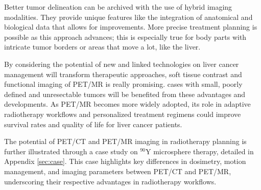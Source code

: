 

Better tumor delineation can be archived with the use of hybrid imaging modalities. They provide unique features like the integration of anatomical and biological data that allows for improvements. More precise treatment planning is possible as this approach advances; this is especially true for body parts with intricate tumor borders or areas that move a lot, like the liver.



By considering the potential of new and linked technologies on liver cancer management will transform therapeutic approaches, soft tissue contrast and functional imaging of PET/MR is really promising. cases with small, poorly defined and unresectable tumors will be benefited from these advantages and developments. As PET/MR becomes more widely adopted, its role in adaptive radiotherapy workflows and personalized treatment regimens could improve survival rates and quality of life for liver cancer patients.

The potential of PET/CT and PET/MR imaging in radiotherapy planning is further illustrated through a case study on $^{90}\text{Y}$ microsphere therapy, detailed in Appendix \ref{sec:case}. This case highlights key differences in dosimetry, motion management, and imaging parameters between PET/CT and PET/MR, underscoring their respective advantages in radiotherapy workflows.